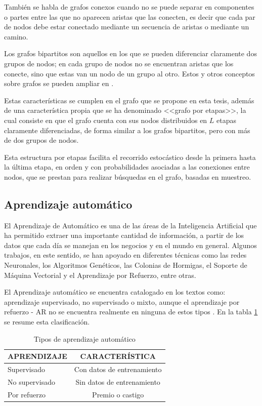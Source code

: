 También se habla de grafos conexos cuando no se puede separar en componentes o partes entre las que no aparecen aristas que las conecten, es decir que cada par de nodos debe estar conectado mediante un secuencia de aristas o mediante un camino.

Los grafos bipartitos son aquellos en los que se pueden diferenciar claramente dos grupos de nodos; en cada grupo de nodos no se encuentran aristas que los conecte, sino que estas van un nodo de un grupo al otro. Estos y otros conceptos sobre grafos se pueden ampliar en \citep{brandstadt1999graph}.

Estas características se cumplen en el grafo que se propone en esta tesis, además de una característica propia que se ha denominado <<grafo por etapas>>, la cual consiste en que el grafo cuenta con sus nodos distribuidos en $L$ etapas claramente diferenciadas, de forma similar a los grafos bipartitos, pero con más de dos grupos de nodos.

Esta estructura por etapas facilita el recorrido estocástico desde la primera hasta la última etapa, en orden y con probabilidades asociadas a las conexiones entre nodos, que se prestan para realizar búsquedas en el grafo, basadas en muestreo.

\subsection{Aprendizaje automático}
El Aprendizaje de Automático es una de las áreas de la Inteligencia Artificial que ha permitido extraer una importante cantidad de información, a partir de los datos que cada día se manejan en los negocios y en el mundo en general. Algunos trabajos, en este sentido, se han apoyado en diferentes técnicas como las redes Neuronales, los Algoritmos Genéticos, las Colonias de Hormigas, el Soporte de Máquina Vectorial y el Aprendizaje por Refuerzo, entre otras. 


El Aprendizaje automático se encuentra catalogado en los textos como: aprendizaje supervisado, no supervisado o mixto, aunque el aprendizaje por refuerzo - AR no se encuentra realmente en ninguna de estos tipos \citep{russell2004inteligencia}. En la tabla \ref{tipoML} se resume esta clasificación.

\begin{table}[H]
\caption{Tipos de aprendizaje automático}
\centering
\begin{tabular}{lc}
\multicolumn{1}{c}{\textbf{APRENDIZAJE}} & \textbf{CARACTERÍSTICA}                         \\ \hline
\multicolumn{1}{|l|}{Supervisado}        & \multicolumn{1}{c|}{Con datos de entrenamiento} \\ \hline
\multicolumn{1}{|l|}{No supervisado}     & \multicolumn{1}{c|}{Sin datos de entrenamiento} \\ \hline
\multicolumn{1}{|l|}{Por refuerzo}       & \multicolumn{1}{c|}{Premio o castigo}           \\ \hline
\end{tabular}
\label{tipoML}
\end{table}


